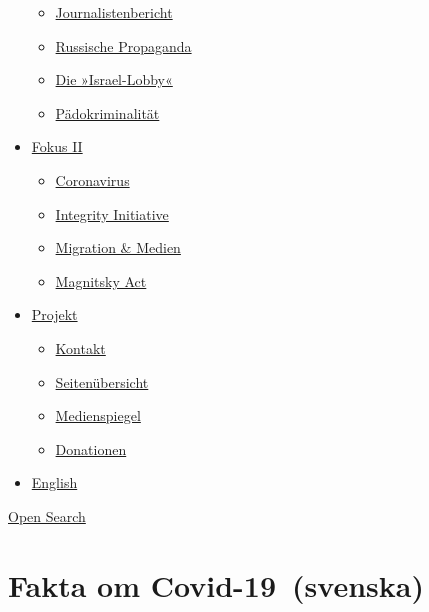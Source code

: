 \begin{itemize}
  \begin{itemize}
  \tightlist
  \item
    \href{https://swprs.org/bericht-eines-journalisten/}{Journalistenbericht}
  \item
    \href{https://swprs.org/russische-propaganda/}{Russische Propaganda}
  \item
    \href{https://swprs.org/die-israel-lobby-fakten-und-mythen/}{Die
    »Israel-Lobby«}
  \item
    \href{https://swprs.org/geopolitik-und-paedokriminalitaet/}{Pädokriminalität}
  \end{itemize}
\item
  \href{https://swprs.org/migration-und-medien/}{Fokus II}

  \begin{itemize}
  \tightlist
  \item
    \href{https://swprs.org/covid-19-hinweis-ii/}{Coronavirus}
  \item
    \href{https://swprs.org/die-integrity-initiative/}{Integrity
    Initiative}
  \item
    \href{https://swprs.org/migration-und-medien/}{Migration \& Medien}
  \item
    \href{https://swprs.org/der-fall-magnitsky/}{Magnitsky Act}
  \end{itemize}
\item
  \href{https://swprs.org/kontakt/}{Projekt}

  \begin{itemize}
  \tightlist
  \item
    \href{https://swprs.org/kontakt/}{Kontakt}
  \item
    \href{https://swprs.org/uebersicht/}{Seitenübersicht}
  \item
    \href{https://swprs.org/medienspiegel/}{Medienspiegel}
  \item
    \href{https://swprs.org/donationen/}{Donationen}
  \end{itemize}
\item
  \href{https://swprs.org/contact/}{English}
\end{itemize}

\protect\hyperlink{}{Open Search}

\hypertarget{fakta-om-covid-19-svenska}{%
\section{Fakta om Covid-19~(svenska)}\label{fakta-om-covid-19-svenska}}

